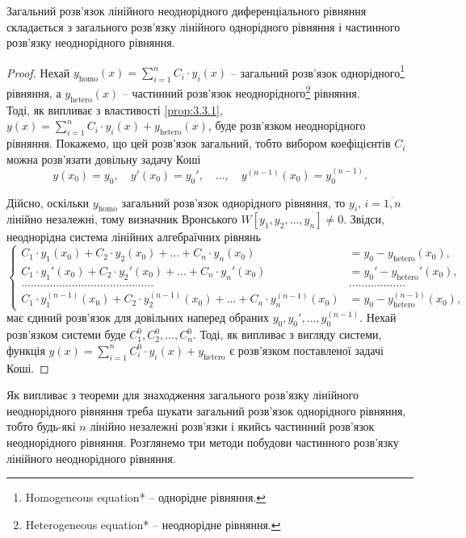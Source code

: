 \begin{theorem}
	Загальний розв’язок лінійного неоднорідного диференціального рівняння складається з загального розв’язку лінійного однорідного рівняння і частинного розв’язку неоднорідного рівняння.
\end{theorem}
\begin{proof}
	Нехай $y_{\text{homo}}(x) = \sum_{i = 1}^n C_i \cdot y_i(x)$ -- загальний розв’язок однорідного\footnote{Homogeneous equation* -- однорідне рівняння.} рівняння, а $y_{\text{hetero}}(x)$ -- частинний розв’язок неоднорідного\footnote{Heterogeneous equation* -- неоднорідне рівняння.} рівняння. \\

	Тоді, як випливає з властивості \ref{prop:3.3.1}, $y(x) = \sum_{i = 1}^n C_i \cdot y_i(x) + y_{\text{hetero}}(x)$, буде розв’язком неоднорідного рівняння. Покажемо, що цей розв’язок  загальний, тобто вибором коефіцієнтів $C_i$ можна розв’язати довільну задачу Коші
	\begin{equation*}
		y(x_0) = y_0, \quad y'(x_0) = y_0', \quad \ldots, \quad y^{(n - 1)}(x_0) = y_0^{(n - 1)}.
	\end{equation*}

	Дійсно, оскільки $y_{\text{homo}}$ загальний роз\-в'яз\-ок однорідного рівняння, то $y_i$, $i = \overline{1, n}$ лінійно незалежні, тому визначник Вронського $W[y_1, y_2, \ldots, y_n] \ne 0$. Звідси, неоднорідна система лінійних алгебраїчних рівнянь 
	\begin{equation*}
		\left\{ \begin{aligned}
			C_1 \cdot y_1(x_0) + C_2 \cdot y_2(x_0) + \ldots + C_n \cdot y_n(x_0) &= y_0 - y_{\text{hetero}}(x_0), \\
			C_1 \cdot y_1'(x_0) + C_2 \cdot y_2'(x_0) + \ldots + C_n \cdot y_n'(x_0) &= y_0' - y_{\text{hetero}}'(x_0), \\
			\ldots \ldots \ldots \ldots \ldots \ldots \ldots \ldots \ldots \ldots \ldots \ldots \ldots \ldots & \ldots \ldots \ldots \ldots \ldots \ldots 	\\
			C_1 \cdot y_1^{(n - 1)}(x_0) + C_2 \cdot y_2^{(n - 1)}(x_0) + \ldots + C_n \cdot y_n^{(n - 1)}(x_0) &= y_0 - y_{\text{hetero}}^{(n - 1)}(x_0),
		\end{aligned} \right.
	\end{equation*}
	має єдиний роз\-в'яз\-ок для довільних наперед обраних $y_0, y_0', \ldots, y_0^{(n - 1)}$. Нехай роз\-в'яз\-ком системи буде $C_1^0, C_2^0, \ldots, C_n^0$. Тоді, як випливає з вигляду системи, функція $y(x) = \sum_{i = 1}^n C_i^0 \cdot y_i(x) + y_{\text{hetero}}$ є роз\-в'яз\-ком поставленої задачі Коші.
\end{proof}

Як випливає з теореми для знаходження загального розв’язку лінійного неоднорідного рівняння треба шукати загальний розв’язок однорідного рівняння, тобто будь-які $n$ лінійно незалежні розв’язки і якийсь частинний розв’язок неоднорідного рівняння. Розглянемо три методи побудови частинного розв’язку лінійного неоднорідного рівняння.